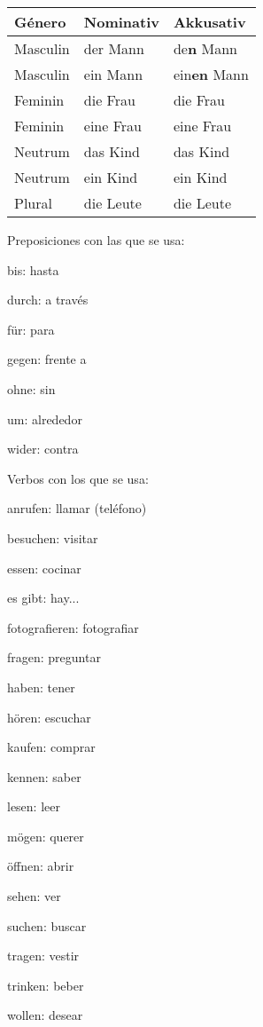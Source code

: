 \begin{tabular}{|l | l | l |}
\hline
\textbf{Género} & \textbf{Nominativ} & \textbf{Akkusativ} \\
\hline
Masculin & der Mann & de\textbf{n} Mann \\
Masculin & ein Mann & ein\textbf{en} Mann \\
Feminin & die Frau & die Frau \\
Feminin & eine Frau & eine Frau \\
Neutrum & das Kind & das Kind \\
Neutrum & ein Kind & ein Kind \\
Plural & die Leute & die Leute\\
\hline
\end{tabular}

Preposiciones con las que se usa:
\begin{multicols}{3}
\begin{myitemize}
\item bis: hasta
\item durch: a través
\item für: para
\item gegen: frente a
\item ohne: sin
\item um: alrededor
\item wider: contra
\end{myitemize}
\end{multicols}

Verbos con los que se usa:
\begin{multicols}{3}
\begin{myitemize}
\item anrufen: llamar (teléfono)
\item besuchen: visitar
\item essen: cocinar
\item es gibt: hay...
\item fotografieren: fotografiar
\item fragen: preguntar
\item haben: tener
\item hören: escuchar
\item kaufen: comprar
\item kennen: saber
\item lesen: leer
\item mögen: querer
\item öffnen: abrir
\item sehen: ver
\item suchen: buscar
\item tragen: vestir
\item trinken: beber
\item wollen: desear
\end{myitemize}
\end{multicols}

